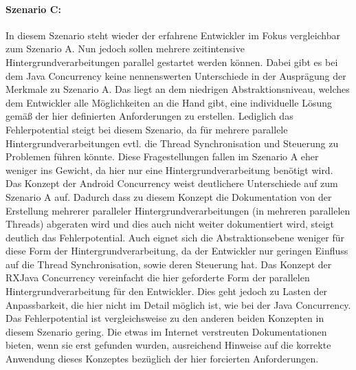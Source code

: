 \documentclass[12pt,oneside,a4paper,bibtotoc,liststotoc]{scrreprt}
\begin{document}
\paragraph{Szenario C:}
In diesem Szenario steht wieder der erfahrene Entwickler im Fokus vergleichbar zum Szenario A. Nun jedoch sollen mehrere zeitintensive Hintergrundverarbeitungen parallel gestartet werden können. Dabei gibt es bei dem Java Concurrency keine nennenswerten Unterschiede in der Ausprägung der Merkmale zu Szenario A. Das liegt an dem niedrigen Abstraktionsniveau, welches dem Entwickler alle Möglichkeiten an die Hand gibt, eine individuelle Lösung gemäß der hier definierten Anforderungen zu erstellen. Lediglich das Fehlerpotential steigt bei diesem Szenario, da für mehrere parallele Hintergrundverarbeitungen evtl. die Thread Synchronisation und Steuerung zu Problemen führen könnte. Diese Fragestellungen fallen im Szenario A eher weniger ins Gewicht, da hier nur eine Hintergrundverarbeitung benötigt wird.
Das Konzept der Android Concurrency weist deutlichere Unterschiede auf zum Szenario A auf. Dadurch dass zu diesem Konzept die Dokumentation von der Erstellung mehrerer paralleler Hintergrundverarbeitungen (in mehreren parallelen Threads) abgeraten wird und dies auch nicht weiter dokumentiert wird, steigt deutlich das Fehlerpotential. Auch eignet sich die Abstraktionsebene weniger für diese Form der Hintergrundverarbeitung, da der Entwickler nur geringen Einfluss auf die Thread Synchronisation, sowie deren Steuerung hat.
Das Konzept der RXJava Concurrency vereinfacht die hier geforderte Form der parallelen Hintergrundverarbeitung für den Entwickler. Dies geht jedoch zu Lasten der Anpassbarkeit, die hier nicht im Detail möglich ist, wie bei der Java Concurrency. Das Fehlerpotential ist vergleichsweise zu den anderen beiden Konzepten in diesem Szenario gering. Die etwas im Internet verstreuten Dokumentationen bieten, wenn sie erst gefunden wurden, ausreichend Hinweise auf die korrekte Anwendung dieses Konzeptes bezüglich der hier forcierten Anforderungen.\newline
\end{document}
